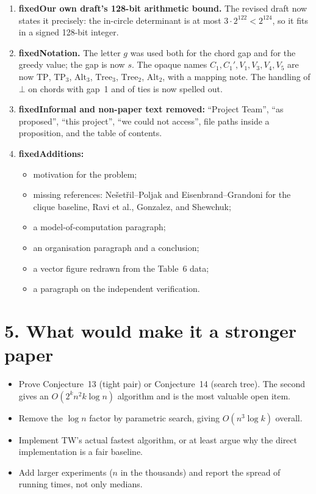 \documentclass[11pt,a4paper]{article}
\newcommand{\ok}{\textcolor{green!45!black}{\textbf{fixed}}}
\begin{document}
\begin{enumerate}[label=\arabic*.]
\item \ok\quad \textbf{Our own draft's 128-bit arithmetic bound.} The revised draft
  now states it precisely: the in-circle determinant is at most
  $3\cdot2^{122}<2^{124}$, so it fits in a signed 128-bit integer.
\item \ok\quad \textbf{Notation.} The letter $g$ was used both for the chord gap and
  for the greedy value; the gap is now $s$. The opaque names
  $C_1,C_1',V_1,V_3,V_4,V_5$ are now $\mathrm{TP}$, $\mathrm{TP}_3$, $\mathrm{Alt}_3$,
  $\mathrm{Tree}_3$, $\mathrm{Tree}_2$, $\mathrm{Alt}_2$, with a mapping note. The
  handling of $\bot$ on chords with gap~1 and of ties is now spelled out.
\item \ok\quad \textbf{Informal and non-paper text removed:} ``Project Team'', ``as
  proposed'', ``this project'', ``we could not access'', file paths inside a
  proposition, and the table of contents.
\item \ok\quad \textbf{Additions:}
  \begin{itemize}
  \item motivation for the problem;
  \item missing references: Nešetřil--Poljak and Eisenbrand--Grandoni for the clique
    baseline, Ravi et al., Gonzalez, and Shewchuk;
  \item a model-of-computation paragraph;
  \item an organisation paragraph and a conclusion;
  \item a vector figure redrawn from the Table~6 data;
  \item a paragraph on the independent verification.
  \end{itemize}
\end{enumerate}

\section*{5. What would make it a stronger paper}
\begin{itemize}
\item Prove Conjecture~13 (tight pair) or Conjecture~14 (search tree). The second
  gives an $O(2^kn^2k\log n)$ algorithm and is the most valuable open item.
\item Remove the $\log n$ factor by parametric search, giving $O(n^3\log k)$ overall.
\item Implement TW's actual fastest algorithm, or at least argue why the direct
  implementation is a fair baseline.
\item Add larger experiments ($n$ in the thousands) and report the spread of running
  times, not only medians.
\end{itemize}
\end{document}

